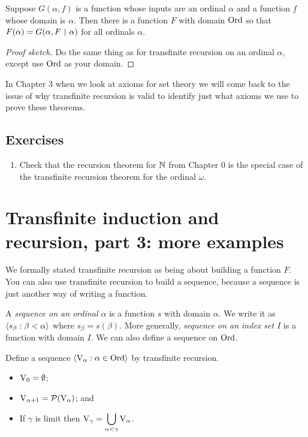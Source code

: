 \documentclass[10pt]{amsart}
\begin{document}
\begin{theorem}
Suppose $G(\alpha,f)$ is a function whose inputs are an ordinal $\alpha$ and a function $f$ whose domain is $\alpha$. Then there is a function $F$ with domain $\mathrm{Ord}$ so that $F(\alpha) = G(\alpha, F \upharpoonright \alpha)$ for all ordinals $\alpha$.
\end{theorem}

\begin{proof}[Proof sketch]
Do the same thing as for transfinite recursion on an ordinal $\alpha$, except use $\mathrm{Ord}$ as your domain. 
\end{proof}

In Chapter 3 when we look at axioms for set theory we will come back to the issue of why transfinite recursion is valid to identify just what axioms we use to prove these theorems.

\subsection*{Exercises}

\begin{enumerate}
\item Check that the recursion theorem for $\mathbb{N}$ from Chapter $0$ is the special case of the transfinite recursion theorem for the ordinal $\omega$.
\end{enumerate}

\newpage

\section{Transfinite induction and recursion, part 3: more examples}

We formally stated transfinite recursion as being about building a function $F$. You can also use transfinite recursion to build a sequence, because a sequence is just another way of writing a function. 

\begin{definition}
A \emph{sequence on an ordinal $\alpha$} is a function $s$ with domain $\alpha$. We write it as ${\left\langle s_\beta : \beta < \alpha \right\rangle}$ where $s_\beta = s(\beta)$. More generally,  \emph{sequence on an index set $I$} is a function with domain $I$. We can also define a sequence on $\mathrm{Ord}$.
\end{definition}

\begin{definition}
Define a sequence ${\left\langle \mathrm{V}_\alpha : \alpha \in \mathrm{Ord} \right\rangle}$ by transfinite recursion.
\begin{itemize}
\item $\mathrm{V}_0 = \emptyset$;
\item $\mathrm{V}_{\alpha+1} = \mathcal{P}(\mathrm{V}_\alpha)$; and
\item If $\gamma$ is limit then $\displaystyle\mathrm{V}_\gamma = \bigcup_{\alpha < \gamma} \mathrm{V}_\alpha$.
\end{itemize}
\end{definition}
\end{document}
